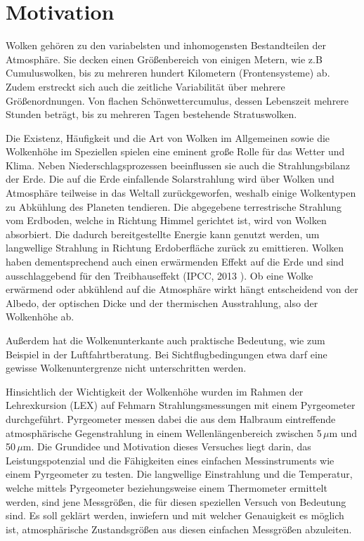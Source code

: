 \documentclass[10pt,a4paper,compsoc,peer review papers]{IEEEtran}
\begin{document}
\section{Motivation}
Wolken gehören zu den variabelsten und inhomogensten Bestandteilen der
Atmosphäre. Sie decken einen Größenbereich von einigen Metern, wie z.B
Cumuluswolken, bis zu mehreren hundert Kilometern (Frontensysteme) ab. Zudem
erstreckt sich auch die zeitliche Variabilität über mehrere Größenordnungen.
Von flachen Schönwettercumulus, dessen Lebenszeit mehrere Stunden beträgt, bis
zu mehreren Tagen bestehende Stratuswolken.

Die Existenz, Häufigkeit und die Art von Wolken im Allgemeinen sowie die
Wolkenhöhe im Speziellen spielen eine eminent große Rolle für das Wetter und
Klima. Neben Niederschlagsprozessen beeinflussen sie auch die Strahlungsbilanz
der Erde. Die auf die Erde einfallende Solarstrahlung wird über Wolken und
Atmosphäre teilweise in das Weltall zurückgeworfen, weshalb einige Wolkentypen
zu Abkühlung des Planeten tendieren. Die abgegebene terrestrische Strahlung vom
Erdboden, welche in Richtung Himmel gerichtet ist, wird von Wolken absorbiert.
Die dadurch bereitgestellte Energie kann genutzt werden, um langwellige
Strahlung in Richtung Erdoberfläche zurück zu emittieren. Wolken haben 
dementsprechend auch einen erwärmenden Effekt auf die Erde und sind
ausschlaggebend für den Treibhauseffekt (IPCC, 2013 \cite{ipcc2013}).
Ob eine Wolke erwärmend oder abkühlend auf die Atmosphäre wirkt hängt
entscheidend von der Albedo, der optischen Dicke und der thermischen
Ausstrahlung, also der Wolkenhöhe ab.

Außerdem hat die Wolkenunterkante auch praktische Bedeutung, wie zum Beispiel
in der Luftfahrtberatung. Bei Sichtflugbedingungen etwa darf eine gewisse
Wolkenuntergrenze nicht unterschritten werden.

Hinsichtlich der Wichtigkeit der Wolkenhöhe wurden im Rahmen der Lehrexkursion
(LEX) auf Fehmarn Strahlungsmessungen mit einem Pyrgeometer durchgeführt.
Pyrgeometer messen dabei die aus dem Halbraum eintreffende atmosphärische
Gegenstrahlung in einem Wellenlängenbereich zwischen 5\,$\mu$m und 50\,$\mu$m.
Die Grundidee und Motivation dieses Versuches liegt darin, das
Leistungspotenzial und die Fähigkeiten eines einfachen Messinstruments wie
einem Pyrgeometer zu testen. Die langwellige Einstrahlung und die Temperatur,
welche mittels Pyrgeometer beziehungsweise einem Thermometer ermittelt werden,
sind jene Messgrößen, die für diesen speziellen Versuch von Bedeutung sind. Es
soll geklärt werden, inwiefern und mit welcher Genauigkeit es möglich ist,
atmosphärische Zustandsgrößen aus diesen einfachen Messgrößen abzuleiten.
\end{document}
